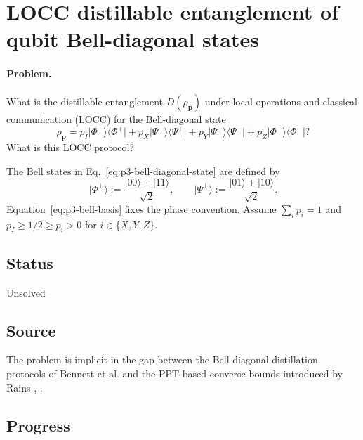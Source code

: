 \section{LOCC distillable entanglement of qubit Bell-diagonal states}
\label{sec:op_b93eb7197c926d9e}

\paragraph{Problem.}
What is the distillable entanglement $D(\rho_{\mathbf p})$ under local
operations and classical communication (LOCC) for the Bell-diagonal state
\begin{equation}
  \rho_{\mathbf p}
  =p_I\lvert\Phi^+\rangle\!\langle\Phi^+\rvert
  +p_X\lvert\Psi^+\rangle\!\langle\Psi^+\rvert
  +p_Y\lvert\Psi^-\rangle\!\langle\Psi^-\rvert
  +p_Z\lvert\Phi^-\rangle\!\langle\Phi^-\rvert?
  \label{eq:p3-bell-diagonal-state}
\end{equation}
What is this LOCC protocol?

The Bell states in Eq.~\eqref{eq:p3-bell-diagonal-state} are defined by
\begin{equation}
  \lvert\Phi^\pm\rangle:=\frac{\lvert00\rangle\pm\lvert11\rangle}{\sqrt2},
  \qquad
  \lvert\Psi^\pm\rangle:=\frac{\lvert01\rangle\pm\lvert10\rangle}{\sqrt2}.
  \label{eq:p3-bell-basis}
\end{equation}
Equation~\eqref{eq:p3-bell-basis} fixes the phase convention.  Assume
$\sum_i p_i=1$ and $p_I\ge1/2\ge p_i>0$ for $i\in\{X,Y,Z\}$.

\subsection*{Status}

Unsolved

\subsection*{Source}

The problem is implicit in the gap between the Bell-diagonal distillation
protocols of Bennett et al. and the PPT-based converse bounds introduced by
Rains ,
.

\subsection*{Progress}

